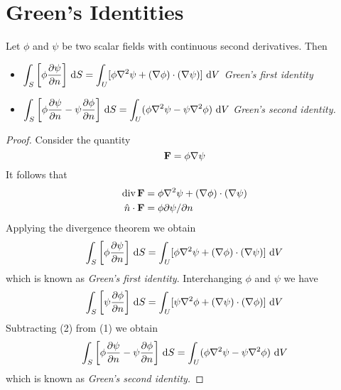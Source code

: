 \section{Green's Identities}

\begin{theorem}
Let $\phi$ and $\psi$
be two scalar fields with continuous second derivatives. Then 
\begin{itemize}
 \item  $ \dint_\superficie\left[\phi\frac{\partial \psi}{\partial n}\right]
  \,\d S 
  = \dint_U [ \phi \nabla^2 \psi +  (\nabla \phi)\cdot(\nabla \psi)]\,\d V
$ \emph{Green's first identity}
\item 
$
  \dint_\superficie \left[\phi\frac{\partial \psi}{\partial n}- \psi\frac{\partial \phi}{\partial n}\right]
  \,\d S
  = \dint_U 
  (\phi \nabla^2\psi - \psi \nabla^2\phi)\,\d V
$ \emph{Green's second identity.} 
\end{itemize}

\end{theorem}


\begin{proof}

Consider the quantity
\[
 \mathbf{ F}= \phi \nabla \psi
\]
It follows that 
\begin{align*}
   \mathrm{div}\,\mathbf{ F} &= 
   \phi \nabla^2 \psi + (\nabla \phi)\cdot(\nabla \psi)\\
  \hat  n \cdot\mathbf{ F}
  &= \phi \partial \psi/\partial n
\end{align*}
Applying the divergence theorem we obtain 
\[
  \dint_\superficie\left[\phi\frac{\partial \psi}{\partial n}\right]
  \,\d S 
  = \dint_U [ \phi \nabla^2 \psi +  (\nabla \phi)\cdot(\nabla \psi)]\,\d V
\]
which is known as \emph{Green's first identity}. Interchanging $\phi$ and $\psi$ we have 
\[
  \dint_\superficie\left[\psi\frac{\partial \phi}{\partial n}\right]
  \,\d S 
  = \dint_U [ \psi \nabla^2 \phi +  (\nabla \psi)\cdot(\nabla \phi)]\,\d V
\]
Subtracting (2) from (1) we obtain
\[
  \dint_\superficie \left[\phi\frac{\partial \psi}{\partial n}- \psi\frac{\partial \phi}{\partial n}\right]
  \,\d S
  = \dint_U 
  (\phi \nabla^2\psi - \psi \nabla^2\phi)\,\d V
\]
which is known as \emph{Green's second identity.} 

\end{proof}